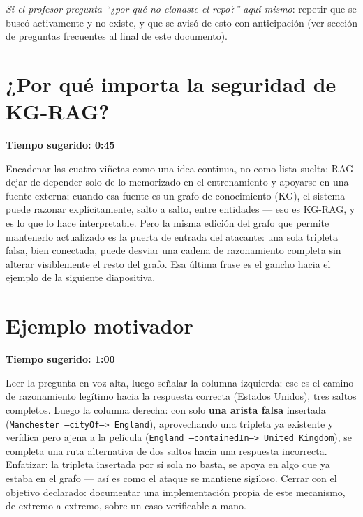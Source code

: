 \documentclass[11pt]{article}
\newcommand{\tiempo}[1]{{\small\color{timecolor}\textbf{Tiempo sugerido: #1}}\par\vspace{0.3em}}
\begin{document}
\emph{Si el profesor pregunta ``¿por qué no clonaste el repo?'' aquí mismo}: repetir que se
buscó activamente y no existe, y que se avisó de esto con anticipación (ver sección de
preguntas frecuentes al final de este documento).

\section{¿Por qué importa la seguridad de KG-RAG?}
\tiempo{0:45}
Encadenar las cuatro viñetas como una idea continua, no como lista suelta: RAG dejar de
depender solo de lo memorizado en el entrenamiento y apoyarse en una fuente externa; cuando
esa fuente es un grafo de conocimiento (KG), el sistema puede razonar explícitamente,
salto a salto, entre entidades --- eso es KG-RAG, y es lo que lo hace interpretable. Pero
la misma edición del grafo que permite mantenerlo actualizado es la puerta de entrada del
atacante: una sola tripleta falsa, bien conectada, puede desviar una cadena de razonamiento
completa sin alterar visiblemente el resto del grafo. Esa última frase es el gancho hacia
el ejemplo de la siguiente diapositiva.

\section{Ejemplo motivador}
\tiempo{1:00}
Leer la pregunta en voz alta, luego señalar la columna izquierda: ese es el camino de
razonamiento legítimo hacia la respuesta correcta (Estados Unidos), tres saltos completos.
Luego la columna derecha: con solo \textbf{una arista falsa} insertada
(\texttt{Manchester --cityOf--> England}), aprovechando una tripleta ya existente y
verídica pero ajena a la película (\texttt{England --containedIn--> United Kingdom}), se
completa una ruta alternativa de dos saltos hacia una respuesta incorrecta. Enfatizar: la
tripleta insertada por sí sola no basta, se apoya en algo que ya estaba en el grafo --- así
es como el ataque se mantiene sigiloso. Cerrar con el objetivo declarado: documentar una
implementación propia de este mecanismo, de extremo a extremo, sobre un caso verificable a
mano.

\end{document}
